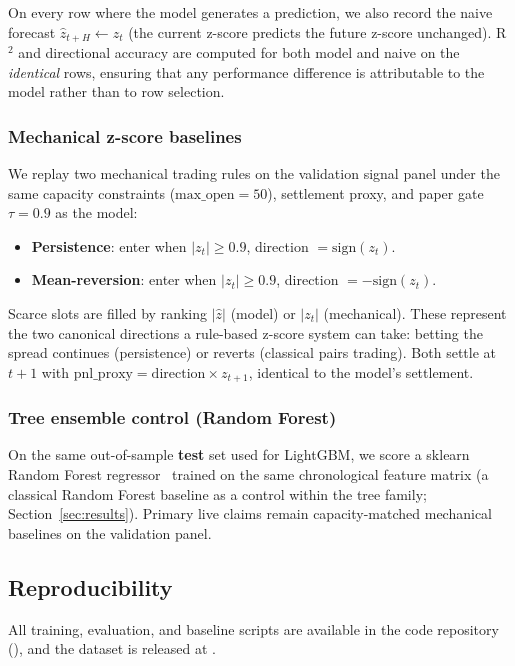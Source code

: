 On every row where the model generates a prediction, we also record the naive forecast $\hat{z}_{t+H} \leftarrow z_t$ (the current z-score predicts the future z-score unchanged). R$^2$ and directional accuracy are computed for both model and naive on the \emph{identical} rows, ensuring that any performance difference is attributable to the model rather than to row selection.

\subsubsection{Mechanical z-score baselines}

We replay two mechanical trading rules on the validation signal panel under the same capacity constraints ($\text{max\_open} = 50$), settlement proxy, and paper gate $\tau{=}0.9$ as the model:

\begin{itemize}
    \item \textbf{Persistence}: enter when $|z_t| \geq 0.9$, direction $= \text{sign}(z_t)$.
    \item \textbf{Mean-reversion}: enter when $|z_t| \geq 0.9$, direction $= -\text{sign}(z_t)$.
\end{itemize}

Scarce slots are filled by ranking $|\hat{z}|$ (model) or $|z_t|$ (mechanical). These represent the two canonical directions a rule-based z-score system can take: betting the spread continues (persistence) or reverts (classical pairs trading). Both settle at $t+1$ with $\text{pnl\_proxy} = \text{direction} \times z_{t+1}$, identical to the model's settlement.

\subsubsection{Tree ensemble control (Random Forest)}

On the same out-of-sample \textbf{test} set used for LightGBM, we score a sklearn Random Forest regressor~\cite{breiman2001random} trained on the same chronological feature matrix (a classical Random Forest baseline as a control within the tree family; Section~\ref{sec:results}). Primary live claims remain capacity-matched mechanical baselines on the validation panel.

\subsection{Reproducibility}

All training, evaluation, and baseline scripts are available in the code repository (\coderef), and the dataset is released at \datasetref.

